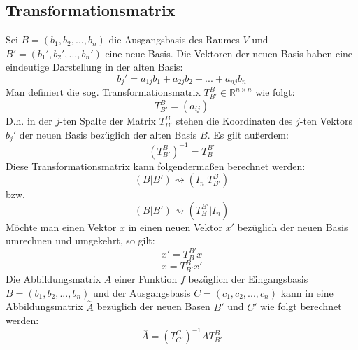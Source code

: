 \documentclass[a4paper,twocolumn,10pt]{article}
\begin{document}
\subsection{Transformationsmatrix}
Sei $B=(b_1,b_2,...,b_n)$ die Ausgangsbasis des Raumes $V$ und $B'=(b_1',b_2',...,b_n')$ eine neue Basis. Die Vektoren der neuen Basis haben eine eindeutige Darstellung in der alten Basis:
\begin{equation*}
b_j'=a_{1j}b_1+a_{2j}b_2+...+a_{nj}b_n
\end{equation*}
Man definiert die sog. Transformationsmatrix $T_{B'}^B \in \mathbb{R}^{n\times n}$ wie folgt:
\begin{equation*}
T_{B'}^B =(a_{ij})
\end{equation*}
D.h. in der $j$-ten Spalte der Matrix $T_{B'}^B$ stehen die Koordinaten des $j$-ten Vektors $b_j'$ der neuen Basis bezüglich der alten Basis $B$. Es gilt außerdem:
\begin{equation*}
(T_{B'}^B)^{-1}=T_B^{B'}
\end{equation*}
Diese Transformationsmatrix kann folgendermaßen berechnet werden:
\begin{equation*}
(B|B')\rightsquigarrow (I_n|T_{B'}^B)
\end{equation*}
bzw.
\begin{equation*}
(B|B')\rightsquigarrow (T_B^{B'}|I_n)
\end{equation*}
Möchte man einen Vektor $x$ in einen neuen Vektor $x'$ bezüglich der neuen Basis umrechnen und umgekehrt, so gilt:
\begin{equation*}
x'=T_B^{B'}x
\end{equation*}
\begin{equation*}
x=T_{B'}^B x'
\end{equation*}
Die Abbildungsmatrix $A$ einer Funktion $f$ bezüglich der Eingangsbasis $B=(b_1,b_2,...,b_n)$ und der Ausgangsbasis $C=(c_1,c_2,...,c_n)$ kann in eine Abbildungsmatrix $\overset{\sim}{A}$ bezüglich der neuen Basen $B'$ und $C'$ wie folgt berechnet werden:
\begin{equation*}
\overset{\sim}{A}=(T_{C'}^C)^{-1}AT_{B'}^B
\end{equation*}
\end{document}
